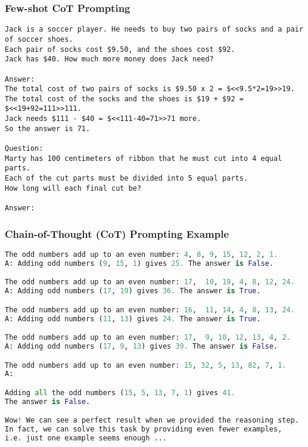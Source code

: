 \begin{frame}[fragile]\frametitle{Few-shot CoT Prompting}

\begin{lstlisting}
Jack is a soccer player. He needs to buy two pairs of socks and a pair of soccer shoes.
Each pair of socks cost $9.50, and the shoes cost $92.
Jack has $40. How much more money does Jack need?

Answer:
The total cost of two pairs of socks is $9.50 x 2 = $<<9.5*2=19>>19.
The total cost of the socks and the shoes is $19 + $92 = $<<19+92=111>>111.
Jack needs $111 - $40 = $<<111-40=71>>71 more.
So the answer is 71.

Question:
Marty has 100 centimeters of ribbon that he must cut into 4 equal parts.
Each of the cut parts must be divided into 5 equal parts.
How long will each final cut be?

Answer:
\end{lstlisting} %


\end{frame}





\begin{frame}[fragile]\frametitle{Chain-of-Thought (CoT) Prompting Example}


\begin{lstlisting}[language=python]
The odd numbers add up to an even number: 4, 8, 9, 15, 12, 2, 1.
A: Adding odd numbers (9, 15, 1) gives 25. The answer is False.

The odd numbers add up to an even number: 17,  10, 19, 4, 8, 12, 24.
A: Adding odd numbers (17, 19) gives 36. The answer is True.

The odd numbers add up to an even number: 16,  11, 14, 4, 8, 13, 24.
A: Adding odd numbers (11, 13) gives 24. The answer is True.

The odd numbers add up to an even number: 17,  9, 10, 12, 13, 4, 2.
A: Adding odd numbers (17, 9, 13) gives 39. The answer is False.

The odd numbers add up to an even number: 15, 32, 5, 13, 82, 7, 1.
A:

Adding all the odd numbers (15, 5, 13, 7, 1) gives 41. 
The answer is False.

Wow! We can see a perfect result when we provided the reasoning step. 
In fact, we can solve this task by providing even fewer examples, 
i.e. just one example seems enough ...
\end{lstlisting}

\end{frame}



